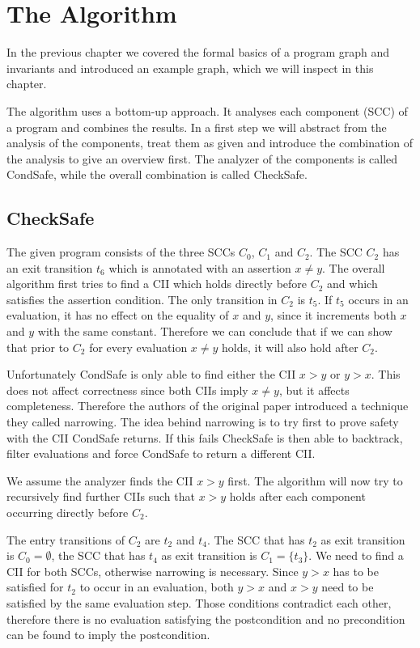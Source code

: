 \section{The Algorithm}
\label{sec:topic}

In the previous chapter we covered the formal basics of a program graph and invariants and introduced an example graph, which we will inspect in this chapter.

The algorithm uses a bottom-up approach. It analyses each component (SCC) of a program and combines the results.
In a first step we will abstract from the analysis of the components, treat them as given and introduce the combination of the analysis to give an overview first.
The analyzer of the components is called CondSafe, while the overall combination is called CheckSafe.

\subsection{CheckSafe}

The given program consists of the three SCCs $C_0$, $C_1$ and $C_2$.
The SCC $C_2$ has an exit transition $t_6$ which is annotated with an assertion $x \neq y$.
The overall algorithm first tries to find a CII which holds directly before $C_2$ and which satisfies the assertion condition.
The only transition in $C_2$ is $t_5$. If $t_5$ occurs in an evaluation, it has no effect on the equality of $x$ and $y$, since it increments both $x$ and $y$ with the same constant.
Therefore we can conclude that if we can show that prior to $C_2$ for every evaluation $x \neq y$ holds, it will also hold after $C_2$.

Unfortunately CondSafe is only able to find either the CII $x > y$ or $y > x$. This does not affect correctness since both CIIs imply $x \neq y$, but it affects completeness.
Therefore the authors of the original paper introduced a technique they called narrowing.
The idea behind narrowing is to try first to prove safety with the CII CondSafe returns.
If this fails CheckSafe is then able to backtrack, filter evaluations and force CondSafe to return a different CII.

We assume the analyzer finds the CII $x > y$ first.
The algorithm will now try to recursively find further CIIs such that $x > y$ holds after each component occurring directly before $C_2$.

The entry transitions of $C_2$ are $t_2$ and $t_4$.
The SCC that has $t_2$ as exit transition is $C_0 = \emptyset$, the SCC that has $t_4$ as exit transition is $C_1 = \lbrace t_3 \rbrace$.
We need to find a CII for both SCCs, otherwise narrowing is necessary.
Since $y > x$ has to be satisfied for $t_2$ to occur in an evaluation, both $y > x$ and $x > y$ need to be satisfied by the same evaluation step.
Those conditions contradict each other, therefore there is no evaluation satisfying the postcondition and no precondition can be found to imply the postcondition.

